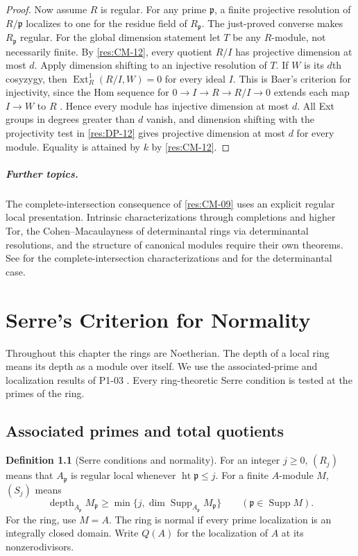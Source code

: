 \documentclass[11pt,oneside,openany]{book}
\theoremstyle{definition}
\newtheorem{definition}[theorem]{Definition}
\theoremstyle{remark}
\begin{document}
\begin{proof}
Now assume $R$ is regular. For any prime $\mathfrak p$,
a finite projective resolution of $R/\mathfrak p$ localizes
to one for the residue field of $R_{\mathfrak p}$. The
just-proved converse makes $R_{\mathfrak p}$ regular.
For the global dimension statement let $T$ be any
$R$-module, not necessarily finite. By \ref{res:CM-12},
every quotient $R/I$ has projective dimension at most
$d$. Apply dimension shifting to an injective resolution
of $T$. If $W$ is its $d$th cosyzygy, then
$\operatorname{Ext}^1_R(R/I,W)=0$ for every ideal $I$.
This is Baer's criterion for injectivity, since the
Hom sequence for $0\to I\to R\to R/I\to0$ extends each
map $I\to W$ to $R$ \cite[Chapter 2]{p103}. Hence every
module has injective dimension at most $d$. All Ext
groups in degrees greater than $d$ vanish, and dimension
shifting with the projectivity test in \ref{res:DP-12}
gives projective dimension at most $d$ for every module.
Equality is attained by $k$ by \ref{res:CM-12}.
\end{proof}

\paragraph{Further topics.}
The complete-intersection consequence of \ref{res:CM-09}
uses an explicit regular local presentation. Intrinsic
characterizations through completions and higher Tor, the
Cohen--Macaulayness of determinantal rings via determinantal
resolutions, and the structure of canonical modules require
their own theorems. See \cite[Section 2.3]{brunsherzog} for the
complete-intersection characterizations and
\cite[Theorem 18.18]{eisenbud} for the determinantal case.
\chapter{Serre's Criterion for Normality}\label{ch:normality}

Throughout this chapter the rings are Noetherian. The depth of a
local ring means its depth as a module over itself. We use the
associated-prime and localization results of P1-03
\cite[Chapter 5]{p103}. Every ring-theoretic Serre condition is
tested at the primes of the ring.

\section{Associated primes and total quotients}

\begin{definition}[Serre conditions and normality]\label{res:SN-01}
For an integer $j\ge 0$, $(R_j)$ means that $A_{\mathfrak p}$
is regular local whenever $\operatorname{ht}\mathfrak p\le j$.
For a finite $A$-module $M$, $(S_j)$ means
\[
 \operatorname{depth}_{A_{\mathfrak p}}M_{\mathfrak p}
 \ge \min\{j,\dim\operatorname{Supp}_{A_{\mathfrak p}}M_{\mathfrak p}\}
 \qquad(\mathfrak p\in\operatorname{Supp}M).
\]
For the ring, use $M=A$. The ring is normal if every prime
localization is an integrally closed domain. Write $Q(A)$ for the
localization of $A$ at its nonzerodivisors.
\end{definition}
\end{document}
